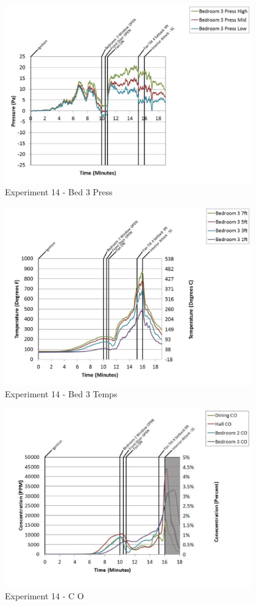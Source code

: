 \documentclass{article}
\begin{document}
\begin{appendices}
	\begin{figure}[h!]
		\centering
		\includegraphics[height=3.05in]{0_Images/Results_Charts/Exp_14_Charts/Bed3Press.pdf}
		\caption{Experiment 14 - Bed 3 Press}
	\end{figure}
 
	\clearpage

	\begin{figure}[h!]
		\centering
		\includegraphics[height=3.05in]{0_Images/Results_Charts/Exp_14_Charts/Bed3Temps.pdf}
		\caption{Experiment 14 - Bed 3 Temps}
	\end{figure}
 

	\begin{figure}[h!]
		\centering
		\includegraphics[height=3.05in]{0_Images/Results_Charts/Exp_14_Charts/CO.pdf}
		\caption{Experiment 14 - C O}
	\end{figure}
 

\end{appendices}
\end{document}
